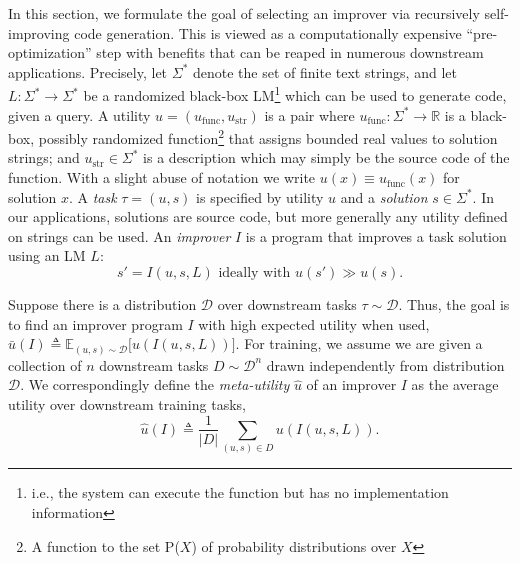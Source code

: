 \documentclass{article} %
\newcommand{\E}{\mathbb{E}}
\newcommand{\metautil}{{\hat{u}}}
\newcommand{\exputil}{{\bar{u}}}
\newcommand{\sol}{{s}}
\newcommand{\D}{{\mathcal{D}}}
\newcommand{\defeq}{\triangleq}
\begin{document}
In this section, we formulate the goal of selecting an improver via recursively self-improving code generation. This is viewed as a computationally expensive ``pre-optimization'' step with benefits that can be reaped in numerous downstream applications. Precisely, let $\Sigma^*$ denote the set of finite text strings, and let $L: \Sigma^* \rightarrow \Sigma^*$ be a randomized black-box LM\footnote{i.e., the system can execute the function but has no implementation information} which can be used to generate code, given a query. A utility $u=(u_\text{func}, u_\text{str})$ is a pair where $u_\text{func}:\Sigma^* \rightarrow \mathbb{R}$ is a black-box, possibly randomized function\footnote{A function to the set P($X$) of probability distributions over $X$} that assigns bounded real values to solution strings; and $u_\text{str} \in \Sigma^*$ is a description  which may simply be the source code of the function. With a slight abuse of notation we write $u(x) \equiv u_\text{func}(x)$ for solution $x$. A \emph{task} $\tau = (u,\sol)$  is specified by utility $u$ and a \emph{solution} $\sol\in \Sigma^*$. In our applications, solutions are source code, but more generally any utility defined on strings can be used. An \emph{improver} $I$ is a program
%
that improves a task solution using an LM $L$:%
\begin{equation}
%
    \sol' = I(u, \sol, L) \text{ ideally with }
u(\sol') \gg u(\sol).
%
\end{equation}
%
%
\vspace{-15px}

Suppose there is a distribution $\D$ over downstream tasks $\tau\sim \D$. Thus, the goal is to find an improver program $I$ with high expected utility when used,%
%
$
%
    \exputil(I) \defeq \E_{(u, \sol) \sim \D} \bigl[u(I(u, \sol, L))\bigr].
%
$
%
%
For training, we assume we are given a collection of $n$ downstream tasks $D\sim \D^n$ drawn independently from distribution $\D$. We correspondingly define the \textit{meta-utility} $\metautil$ of an improver $I$ as the average utility over downstream training tasks, 
\begin{equation}
    \metautil(I)\defeq\frac{1}{|D|}\sum_{(u,\sol)\in D}u(I(u, \sol, L)).
\end{equation}
\vspace{-12px}
\end{document}
